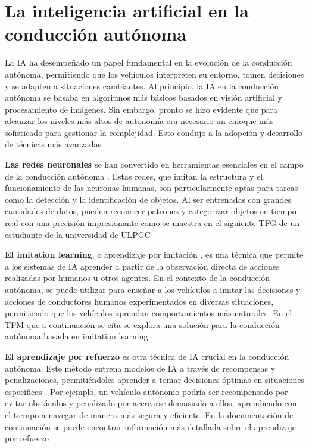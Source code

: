 \section{La inteligencia artificial en la conducción autónoma}
\label{sec:La inteligencia artificial en la conducción autónoma}

La \ac{IA} ha desempeñado un papel fundamental en la evolución de la conducción autónoma, permitiendo que los vehículos interpreten su entorno, tomen decisiones y se adapten a situaciones cambiantes. Al principio, la \ac{IA} en la conducción autónoma se basaba en algoritmos más básicos basados en visión artificial y procesamiento de imágenes. Sin embargo, pronto se hizo evidente que para alcanzar los niveles más altos de autonomía era necesario un enfoque más sofisticado para gestionar la complejidad. Esto condujo a la adopción y desarrollo de técnicas más avanzadas.

\textbf{Las redes neuronales} se han convertido en herramientas esenciales en el campo de la conducción autónoma \cite{Implementación_de_redes_neuronales_para_conducción_autónoma}. Estas redes, que imitan la estructura y el funcionamiento de las neuronas humanas, son particularmente aptas para tareas como la detección y la identificación de objetos. Al ser entrenadas con grandes cantidades de datos, pueden reconocer patrones y categorizar objetos en tiempo real con una precisión impresionante como se muestra en el siguiente \ac{TFG} de un estudiante de la universidad de \ac{ULPGC} \cite{detección_de_objetos_con_redes_neuronales}

\textbf{El imitation learning}, o aprendizaje por imitación \cite{imitation-learning-2}, es una técnica que permite a los sistemas de \ac{IA} aprender a partir de la observación directa de acciones realizadas por humanos u otros agentes. En el contexto de la conducción autónoma, se puede utilizar para enseñar a los vehículos a imitar las decisiones y acciones de conductores humanos experimentados en diversas situaciones, permitiendo que los vehículos aprendan comportamientos más naturales. En el \ac{TFM} que a continuación se cita se explora una solución para la conducción autónoma basada en imitation learning \cite{conducción_autónoma_imitation_learning}.

\textbf{El aprendizaje por refuerzo} es otra técnica de \ac{IA} crucial en la conducción autónoma. Este método entrena modelos de \ac{IA} a través de recompensas y penalizaciones, permitiéndoles aprender a tomar decisiones óptimas en situaciones específicas \cite{RL-2}. Por ejemplo, un vehículo autónomo podría ser recompensado por evitar obstáculos y penalizado por acercarse demasiado a ellos, aprendiendo con el tiempo a navegar de manera más segura y eficiente. En la documentación de continuación se puede encontrar información más detallada sobre el aprendizaje por refuerzo \cite{aprendizaje_por_refuerzo}

